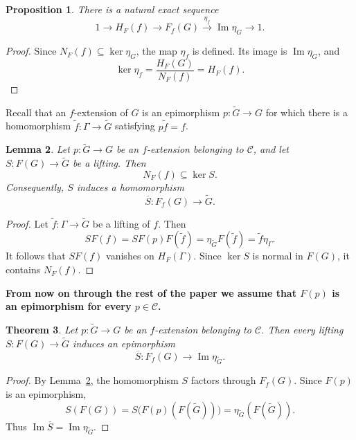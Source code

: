 \documentclass[10pt]{amsart}
\newtheorem{theorem}{Theorem}[section]
\newtheorem{proposition}[theorem]{Proposition}
\newtheorem{lemma}[theorem]{Lemma}
\renewcommand{\*}{\cdot {\dots} \cdot}
\newcommand{\?}[1]{\overset{?}{#1}}
\numberwithin{equation}{section}
\begin{document}
\begin{proposition}\label{prop:relative-exact-sequence}
There is a natural exact sequence
\[
1\longrightarrow H_F(f)
\longrightarrow F_f(G)
\xrightarrow{\,\eta_f\,}
\operatorname{Im}\eta_G
\longrightarrow 1.
\]
\end{proposition}

\begin{proof}
Since $N_F(f)\subseteq\ker\eta_G$, the map $\eta_f$ is defined.
Its image is $\operatorname{Im}\eta_G$, and
\[
\ker\eta_f=\frac{H_F(G)}{N_F(f)}=H_F(f).
\]
\end{proof}

Recall that an $f$-extension of $G$ is an epimorphism
$p\colon\widetilde G\to G$ for which there is a homomorphism
$\widetilde f\colon\Gamma\to\widetilde G$ satisfying
$p\widetilde f=f$.

\begin{lemma}\label{lem:f-extension-factorization}
Let $p\colon\widetilde G\to G$ be an $f$-extension belonging to
$\mathcal C$, and let $S\colon F(G)\to\widetilde G$ be a
lifting. Then
\[
N_F(f)\subseteq\ker S.
\]
Consequently, $S$ induces a homomorphism
\[
\overline S\colon F_f(G)\longrightarrow\widetilde G.
\]
\end{lemma}

\begin{proof}
Let $\widetilde f\colon\Gamma\to\widetilde G$ be a lifting of
$f$. Then
\[
SF(f)
 =SF(p)F(\widetilde f)
 =\eta_{\widetilde G}F(\widetilde f)
 =\widetilde f\eta_\Gamma.
\]
It follows that $SF(f)$ vanishes on $H_F(\Gamma)$. Since
$\ker S$ is normal in $F(G)$, it contains $N_F(f)$.
\end{proof}

\textbf{From now on through the rest of the paper we assume that $F(p)$ is an epimorphism for every
$p\in\mathcal C$.}

\begin{theorem}\label{thm:relative-lifting}
Let $p\colon\widetilde G\to G$ be an $f$-extension belonging to
$\mathcal C$. Then every lifting
$S\colon F(G)\to\widetilde G$ induces an epimorphism
\[
\overline S\colon
F_f(G)\longrightarrow\operatorname{Im}\eta_{\widetilde G}.
\]
\end{theorem}

\begin{proof}
By Lemma~\ref{lem:f-extension-factorization}, the homomorphism
$S$ factors through $F_f(G)$. Since $F(p)$ is an epimorphism,
\[
S(F(G))
 =S\bigl(F(p)(F(\widetilde G))\bigr)
 =\eta_{\widetilde G}(F(\widetilde G)).
\]
Thus $\operatorname{Im}\overline S
=\operatorname{Im}\eta_{\widetilde G}$.
\end{proof}
\end{document}
